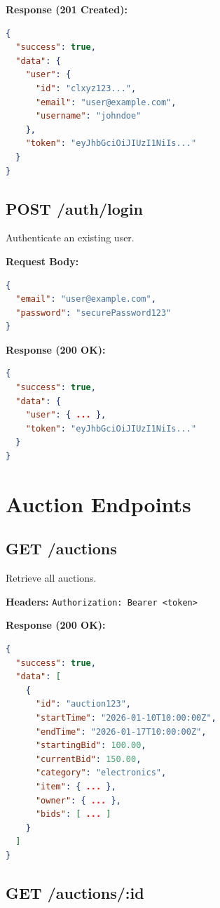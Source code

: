 \documentclass[12pt,a4paper]{report}
\begin{document}
\textbf{Response (201 Created):}
\begin{lstlisting}[language=json]
{
  "success": true,
  "data": {
    "user": {
      "id": "clxyz123...",
      "email": "user@example.com",
      "username": "johndoe"
    },
    "token": "eyJhbGciOiJIUzI1NiIs..."
  }
}
\end{lstlisting}

\subsection{POST /auth/login}

Authenticate an existing user.

\textbf{Request Body:}
\begin{lstlisting}[language=json]
{
  "email": "user@example.com",
  "password": "securePassword123"
}
\end{lstlisting}

\textbf{Response (200 OK):}
\begin{lstlisting}[language=json]
{
  "success": true,
  "data": {
    "user": { ... },
    "token": "eyJhbGciOiJIUzI1NiIs..."
  }
}
\end{lstlisting}

\section{Auction Endpoints}

\subsection{GET /auctions}

Retrieve all auctions.

\textbf{Headers:} \texttt{Authorization: Bearer <token>}

\textbf{Response (200 OK):}
\begin{lstlisting}[language=json]
{
  "success": true,
  "data": [
    {
      "id": "auction123",
      "startTime": "2026-01-10T10:00:00Z",
      "endTime": "2026-01-17T10:00:00Z",
      "startingBid": 100.00,
      "currentBid": 150.00,
      "category": "electronics",
      "item": { ... },
      "owner": { ... },
      "bids": [ ... ]
    }
  ]
}
\end{lstlisting}

\subsection{GET /auctions/:id}
\end{document}
